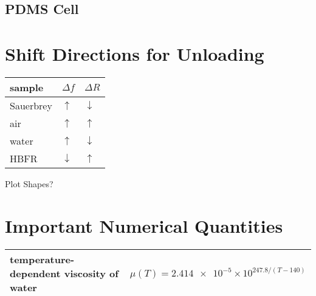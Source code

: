 \documentclass[a4paper]{article}
\begin{document}
\subsection{PDMS Cell}

\section{Shift Directions for Unloading}
\begin{tabular}{lll}
 \toprule
 sample & $\Delta f$ & $\Delta R$ \\
 \midrule
 Sauerbrey & $\uparrow$ &   $\downarrow$ \\
 air       & $\uparrow$ & $\uparrow$ \\
 water     & $\uparrow$ &   $\downarrow$ \\
 HBFR      & $\downarrow$ & $\uparrow$ \\
 \bottomrule
\end{tabular}

Plot Shapes?
\section{Important Numerical Quantities}
\begin{table}
 \centering
 \begin{tabularx}{\textwidth}{ l l }
  \toprule
  temperature-dependent viscosity of water & $\mu(T)=\num{2.414e-5}\times 10^{247.8/(T-140)}$\\
  \bottomrule
 \end{tabularx}
\end{table}
\end{document}
